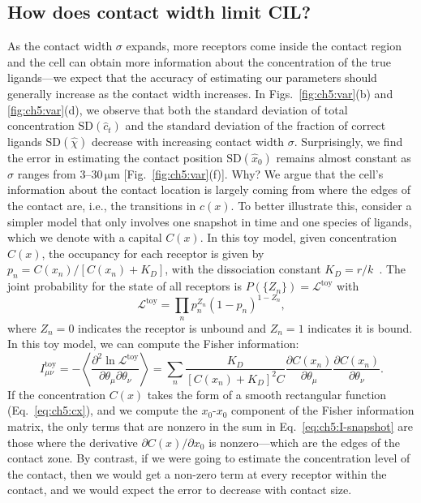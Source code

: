 \subsection{How does contact width limit CIL?}
\label{sec:ch5:width}

As the contact width $\sigma$ expands, more receptors come inside the contact region and the cell can obtain more information about the concentration of the true ligands---we expect that the accuracy of estimating our parameters should generally increase as the contact width increases.
In Figs.~\ref{fig:ch5:var}(b) and \ref{fig:ch5:var}(d), we observe that both the standard deviation of total concentration $\textrm{SD}(\hat{c}_t)$ and the standard deviation of the fraction of correct ligands $\textrm{SD}(\hat{\chi})$ decrease with increasing contact width $\sigma$.
Surprisingly, we find the error in estimating the contact position $\textrm{SD}(\hat{x}_0)$ remains almost constant as $\sigma$ ranges from $3\textrm{--}30\,\mathrm{\mu m}$ [Fig.~\ref{fig:ch5:var}(f)].
Why?
We argue that the cell's information about the contact location is largely coming from where the edges of the contact are, i.e., the transitions in $c(x)$.
To better illustrate this, consider a simpler model that only involves one snapshot in time and one species of ligands, which we denote with a capital $C(x)$.
In this toy model, given concentration $C(x)$, the occupancy for each receptor is given by $p_n=C(x_n)/[C(x_n)+K_D]$, with the dissociation constant $K_D=r/k$~\cite{hu2010physical}.
The joint probability for the state of all receptors is $P(\{Z_n\}) = \mathcal{L}^\textrm{toy}$ with
\begin{equation}
    \mathcal{L}^\textrm{toy} =\prod_n p_n^{Z_n}(1-p_n)^{1-Z_n},
\end{equation}
where $Z_n = 0$ indicates the receptor is unbound and $Z_n = 1$ indicates it is bound.
In this toy model, we can compute the Fisher information:
\begin{equation}
        I^\textrm{toy}_{\mu\nu}=-\left< \frac{\partial^2\ln \mathcal{L}^\textrm{toy}}{\partial\theta_\mu\partial \theta_\nu} \right> =\sum_{n}\frac{K_D}{[C(x_n)+K_D]^2 C}\frac{\partial C(x_n)}{\partial \theta_\mu}\frac{\partial C(x_n)}{\partial \theta_\nu}. \label{eq:ch5:I-snapshot}
\end{equation}
If the concentration $C(x)$ takes the form of a smooth rectangular function (Eq.~\eqref{eq:ch5:cx}), and we compute the $x_0$-$x_0$ component of the Fisher information matrix, the only terms that are nonzero in the sum in Eq.~\eqref{eq:ch5:I-snapshot} are those where the derivative $\partial C(x) / \partial x_0$ is nonzero---which are the edges of the contact zone.
By contrast, if we were going to estimate the concentration level of the contact, then we would get a non-zero term at every receptor within the contact, and we would expect the error to decrease with contact size.

